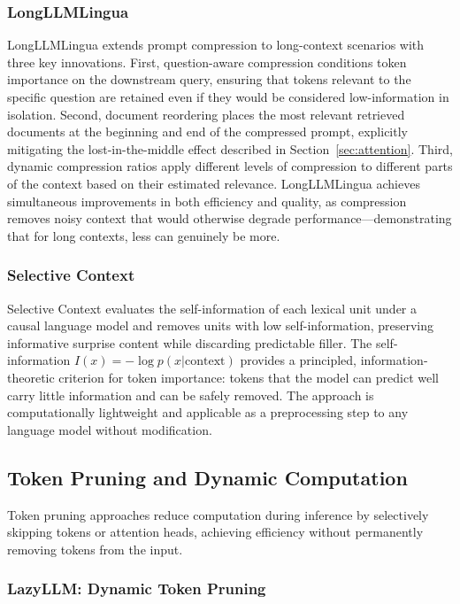 \documentclass[11pt,letterpaper]{article}
\begin{document}
\subsubsection{LongLLMLingua}

LongLLMLingua \cite{jiang2024longllmlingua} extends prompt compression to long-context scenarios with three key innovations. First, question-aware compression conditions token importance on the downstream query, ensuring that tokens relevant to the specific question are retained even if they would be considered low-information in isolation. Second, document reordering places the most relevant retrieved documents at the beginning and end of the compressed prompt, explicitly mitigating the lost-in-the-middle effect described in Section~\ref{sec:attention}. Third, dynamic compression ratios apply different levels of compression to different parts of the context based on their estimated relevance. LongLLMLingua achieves simultaneous improvements in both efficiency and quality, as compression removes noisy context that would otherwise degrade performance---demonstrating that for long contexts, less can genuinely be more.

\subsubsection{Selective Context}

Selective Context \cite{li2023compressing} evaluates the self-information of each lexical unit under a causal language model and removes units with low self-information, preserving informative surprise content while discarding predictable filler. The self-information $I(x) = -\log p(x | \text{context})$ provides a principled, information-theoretic criterion for token importance: tokens that the model can predict well carry little information and can be safely removed. The approach is computationally lightweight and applicable as a preprocessing step to any language model without modification.

\subsection{Token Pruning and Dynamic Computation}

Token pruning approaches reduce computation during inference by selectively skipping tokens or attention heads, achieving efficiency without permanently removing tokens from the input.

\subsubsection{LazyLLM: Dynamic Token Pruning}
\end{document}
